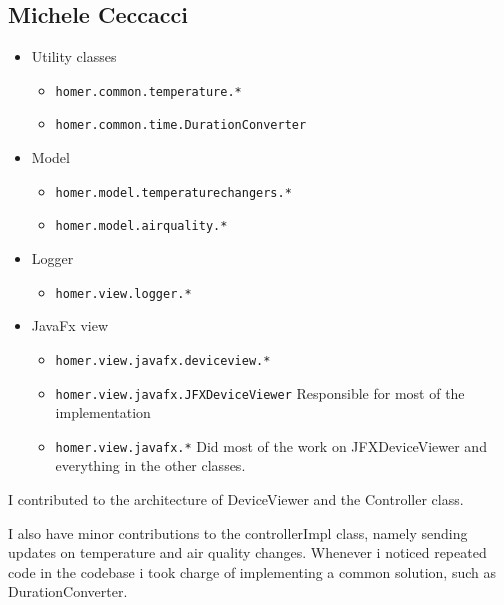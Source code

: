\subsection{Michele Ceccacci}

\begin{itemize}
    \item Utility classes
    \begin{itemize}
        \item \texttt{homer.common.temperature.*} 
		\item \texttt{homer.common.time.DurationConverter}
    \end{itemize}
	\item Model
	\begin{itemize}
		\item \texttt{homer.model.temperaturechangers.*}
		\item \texttt{homer.model.airquality.*}
	\end{itemize}
	\item Logger
	\begin{itemize}
		\item \texttt{homer.view.logger.*}
	\end{itemize}
	\item JavaFx view
	\begin{itemize}
		\item \texttt{homer.view.javafx.deviceview.*}
		\item \texttt{homer.view.javafx.JFXDeviceViewer} Responsible for most of the implementation
		\item \texttt{homer.view.javafx.*} Did most of the work on JFXDeviceViewer and everything in the other classes.
	\end{itemize}

\end{itemize}

I contributed to the architecture of DeviceViewer and the Controller class.

I also have minor contributions to the controllerImpl class, namely sending updates on temperature and air quality changes.
Whenever i noticed repeated code in the codebase i took charge of implementing a common solution, such as DurationConverter.
